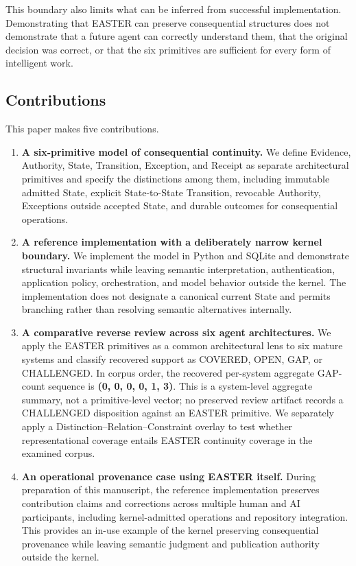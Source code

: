 \documentclass[11pt]{article}
\begin{document}
This boundary also limits what can be inferred from successful implementation. Demonstrating that EASTER can preserve consequential structures does not demonstrate that a future agent can correctly understand them, that the original decision was correct, or that the six primitives are sufficient for every form of intelligent work.

\subsection{Contributions}

This paper makes five contributions.

\begin{enumerate}
\item \textbf{A six-primitive model of consequential continuity.}   We define Evidence, Authority, State, Transition, Exception, and Receipt as separate architectural primitives and specify the distinctions among them, including immutable admitted State, explicit State-to-State Transition, revocable Authority, Exceptions outside accepted State, and durable outcomes for consequential operations.

\item \textbf{A reference implementation with a deliberately narrow kernel boundary.}   We implement the model in Python and SQLite and demonstrate structural invariants while leaving semantic interpretation, authentication, application policy, orchestration, and model behavior outside the kernel. The implementation does not designate a canonical current State and permits branching rather than resolving semantic alternatives internally.

\item \textbf{A comparative reverse review across six agent architectures.}   We apply the EASTER primitives as a common architectural lens to six mature systems and classify recovered support as COVERED, OPEN, GAP, or CHALLENGED. In corpus order, the recovered per-system aggregate GAP-count sequence is \textbf{(0, 0, 0, 0, 1, 3)}. This is a system-level aggregate summary, not a primitive-level vector; no preserved review artifact records a CHALLENGED disposition against an EASTER primitive. We separately apply a Distinction--Relation--Constraint overlay to test whether representational coverage entails EASTER continuity coverage in the examined corpus.

\item \textbf{An operational provenance case using EASTER itself.}   During preparation of this manuscript, the reference implementation preserves contribution claims and corrections across multiple human and AI participants, including kernel-admitted operations and repository integration. This provides an in-use example of the kernel preserving consequential provenance while leaving semantic judgment and publication authority outside the kernel.


\end{enumerate}
\end{document}
